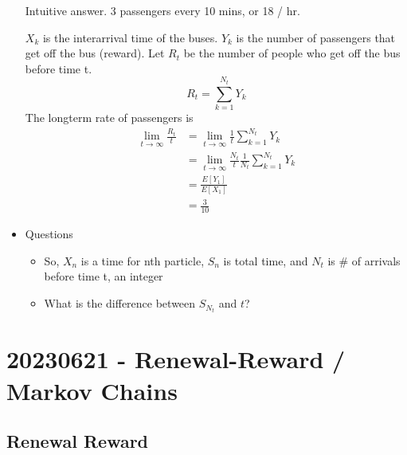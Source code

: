 \documentclass{report}
\begin{document}
\begin{itemize}
        {
          Intuitive answer.  3 passengers every 10 mins, or 18 / hr.

          $X_k$ is the interarrival time of the buses. $Y_k$ is the 
          number of passengers that get off the bus (reward).  Let $R_t$
          be the number of people who get off the bus before time t.
          \[ R_t = \sum^{N_t}_{k=1} Y_k \]
          The longterm rate of passengers is
          \begin{align*}
            \lim_{t \to \infty} \frac{R_t}{t} &= \lim_{t \to \infty} \frac{1}{t} \sum^{N_t}_{k=1} Y_k \\
                  &= \lim_{t \to \infty} \frac{N_t}{t} \frac{1}{N_t} 
                             \sum^{N_t}_{k=1} Y_k \\
                  &= \frac{E[Y_1]}{E[X_1]} \\
                  &= \frac{3}{10} 
          \end{align*}
        }
        

      \item Questions
        \begin{itemize}
          \item So, $X_n$ is a time for nth particle,  $S_n$ is total time,
            and $N_t$ is \# of arrivals before time t, an integer
          \item What is the difference between $S_{N_t}$ and $t$?
        \end{itemize}
      

  \end{itemize}

\chapter*{20230621 - Renewal-Reward / Markov Chains}
\section{Renewal Reward}%
\end{document}
